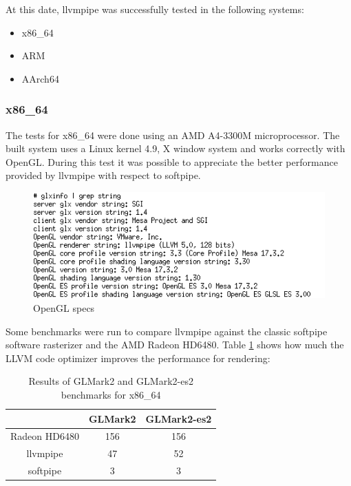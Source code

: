 \documentclass[12pt,a4paper,oneside]{article}
\begin{document}
At this date, llvmpipe was successfully tested in the following systems:

\begin{itemize}
  \item x86\_64
  \item ARM
  \item AArch64
\end{itemize}

\subsubsection*{x86\_64}
The tests for x86\_64 were done using an AMD A4-3300M microprocessor. The built
system uses a Linux kernel 4.9, X window system and works correctly with OpenGL.
During this test it was possible to appreciate the better performance provided by
llvmpipe with respect to softpipe.
\begin{figure}[H]
\centering
  \includegraphics[scale=0.75]{img/llvmpipe-glspecs.png}
  \caption{OpenGL specs}
  \label{fig:llvmpipe-glspecs}
\end{figure}

Some benchmarks were run to compare llvmpipe against the classic softpipe software
rasterizer and the AMD Radeon HD6480. Table \ref{tab:glmark2_x86} shows how much
the LLVM code optimizer improves the performance for rendering:

\begin{table}[h!]
  \begin{center}
    \caption{Results of GLMark2 and GLMark2-es2 benchmarks for x86\_64}
    \label{tab:glmark2_x86}
    \begin{tabular}{ c |c c }
    & {GLMark2} & {GLMark2-es2} \\
    \hline
    Radeon HD6480 & 156 & 156 \\
    llvmpipe & 47 & 52 \\
    softpipe & 3 & 3 \\
    \end{tabular}
  \end{center}
\end{table}
\end{document}
